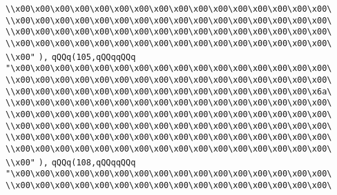 \verb|\\x00\x00\x00\x00\x00\x00\x00\x00\x00\x00\x00\x00\x00\x00\x00\x00\|\newline
\verb|\\x00\x00\x00\x00\x00\x00\x00\x00\x00\x00\x00\x00\x00\x00\x00\x00\|\newline
\verb|\\x00\x00\x00\x00\x00\x00\x00\x00\x00\x00\x00\x00\x00\x00\x00\x00\|\newline
\verb|\\x00\x00\x00\x00\x00\x00\x00\x00\x00\x00\x00\x00\x00\x00\x00\x00\|\newline
\verb|\\x00"|\newline
\verb|),|\newline
\verb|qQQq(105,qQQqqQQq|\newline
\verb|"\x00\x00\x00\x00\x00\x00\x00\x00\x00\x00\x00\x00\x00\x00\x00\x00\|\newline
\verb|\\x00\x00\x00\x00\x00\x00\x00\x00\x00\x00\x00\x00\x00\x00\x00\x00\|\newline
\verb|\\x00\x00\x00\x00\x00\x00\x00\x00\x00\x00\x00\x00\x00\x00\x00\x6a\|\newline
\verb|\\x00\x00\x00\x00\x00\x00\x00\x00\x00\x00\x00\x00\x00\x00\x00\x00\|\newline
\verb|\\x00\x00\x00\x00\x00\x00\x00\x00\x00\x00\x00\x00\x00\x00\x00\x00\|\newline
\verb|\\x00\x00\x00\x00\x00\x00\x00\x00\x00\x00\x00\x00\x00\x00\x00\x00\|\newline
\verb|\\x00\x00\x00\x00\x00\x00\x00\x00\x00\x00\x00\x00\x00\x00\x00\x00\|\newline
\verb|\\x00\x00\x00\x00\x00\x00\x00\x00\x00\x00\x00\x00\x00\x00\x00\x00\|\newline
\verb|\\x00"|\newline
\verb|),|\newline
\verb|qQQq(108,qQQqqQQq|\newline
\verb|"\x00\x00\x00\x00\x00\x00\x00\x00\x00\x00\x00\x00\x00\x00\x00\x00\|\newline
\verb|\\x00\x00\x00\x00\x00\x00\x00\x00\x00\x00\x00\x00\x00\x00\x00\x00\|\newline
